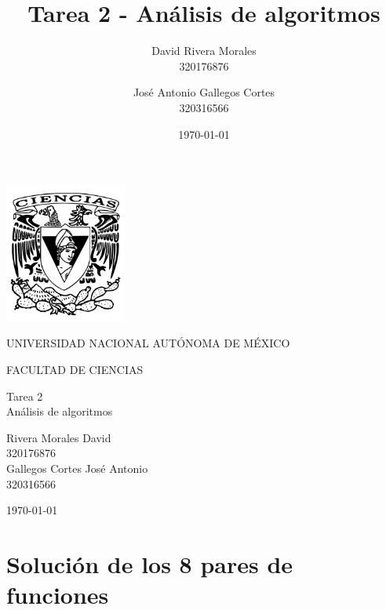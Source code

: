 \documentclass[12pt]{article}
\title{Tarea 2 - Análisis de algoritmos}
\author{David Rivera Morales \\ 320176876 \and José Antonio Gallegos Cortes \\ 320316566}
\date{\today}
\begin{document}
\begin{titlepage}
\begin{center}

\includegraphics[width=0.3\textwidth]{images/escudo-unam.png}

\vspace{1cm}
{\Large UNIVERSIDAD NACIONAL AUTÓNOMA DE MÉXICO}

\vspace{1.5cm}
{\Large FACULTAD DE CIENCIAS}

\vspace{3cm}
{\Large Tarea 2}\\
\vspace{0.5cm}
{\Large Análisis de algoritmos}

\vspace{2cm}
\vspace{0.5cm}
{\large Rivera Morales David}\\
{\large 320176876}\\
\vspace{0.5cm}
{\large Gallegos Cortes José Antonio}\\
{\large 320316566}

\vfill
{\large \today}
\end{center}
\end{titlepage}

\section*{Solución de los 8 pares de funciones}

\end{document}
